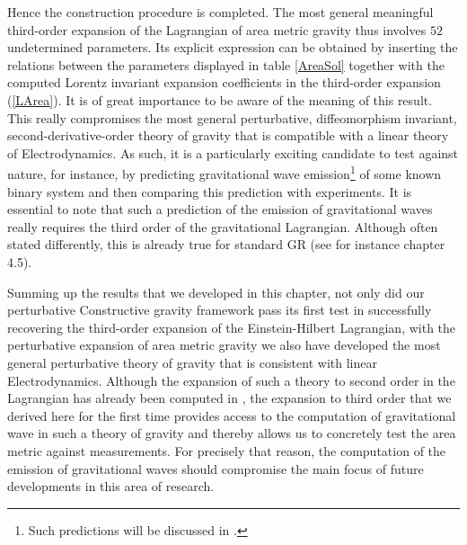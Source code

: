 Hence the construction procedure is completed. The most general meaningful third-order expansion of the Lagrangian of area metric gravity thus involves $52$ undetermined parameters. Its explicit expression can be obtained by inserting the relations between the parameters displayed in table \ref{AreaSol} together with the computed Lorentz invariant expansion coefficients in the third-order expansion (\ref{LArea}). It is of great importance to be aware of the meaning of this result. This really compromises the most general perturbative, diffeomorphism invariant, second-derivative-order theory of gravity that is compatible with a linear theory of Electrodynamics. As such, it is a particularly exciting candidate to test against nature, for instance, by predicting gravitational wave emission\footnote{Such predictions will be discussed in \cite{NilsPHD}.} of some known binary system and then comparing this prediction with experiments. It is essential to note that such a prediction of the emission of gravitational waves really requires the third order of the gravitational Lagrangian. Although often stated differently, this is already true for standard GR (see for instance \cite{1984grra.book.....S} chapter 4.5).

Summing up the results that we developed in this chapter, not only did our perturbative Constructive gravity framework pass its first test in successfully recovering the third-order expansion of the Einstein-Hilbert Lagrangian, with the perturbative expansion of area metric gravity we also have developed the most general perturbative theory of gravity that is consistent with linear Electrodynamics. Although the expansion of such a theory to second order in the Lagrangian has already been computed in \cite{2017arXiv170803870S}, the expansion to third order that we derived here for the first time provides access to the computation of gravitational wave in such a theory of gravity and thereby allows us to concretely test the area metric against measurements. For precisely that reason, the computation of the emission of gravitational waves should compromise the main focus of future developments in this area of research. 